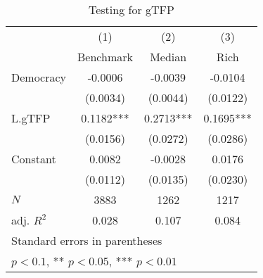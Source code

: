 \begin{table}[htbp]\centering
\def\sym#1{\ifmmode^{#1}\else\(^{#1}\)\fi}
\caption{Testing for gTFP \label{tab:regression8}}
\begin{tabular}{l*{3}{c}}
\hline\hline
            &\multicolumn{1}{c}{(1)}&\multicolumn{1}{c}{(2)}&\multicolumn{1}{c}{(3)}\\
            &\multicolumn{1}{c}{Benchmark}&\multicolumn{1}{c}{Median}&\multicolumn{1}{c}{Rich}\\
\hline
Democracy   &     -0.0006   &     -0.0039   &     -0.0104   \\
            &    (0.0034)   &    (0.0044)   &    (0.0122)   \\
[1em]
L.gTFP      &      0.1182***&      0.2713***&      0.1695***\\
            &    (0.0156)   &    (0.0272)   &    (0.0286)   \\
[1em]
Constant    &      0.0082   &     -0.0028   &      0.0176   \\
            &    (0.0112)   &    (0.0135)   &    (0.0230)   \\
\hline
\(N\)       &        3883   &        1262   &        1217   \\
adj. \(R^{2}\)&       0.028   &       0.107   &       0.084   \\
\hline\hline
\multicolumn{4}{l}{\footnotesize Standard errors in parentheses}\\
\multicolumn{4}{l}{\footnotesize * \(p<0.1\), ** \(p<0.05\), *** \(p<0.01\)}\\
\end{tabular}
\end{table}
